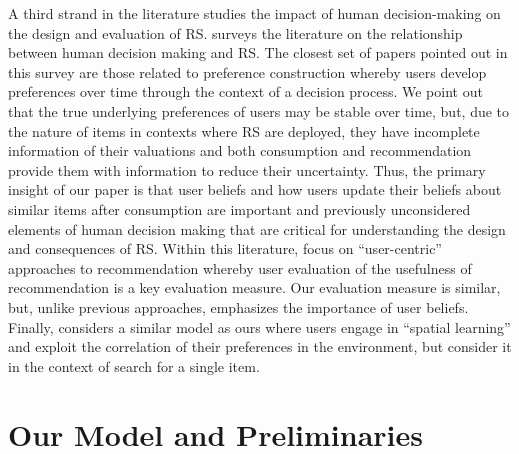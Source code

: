 \documentclass[manuscript]{acmart}
\begin{document}
A third strand in the literature studies the impact of human decision-making on the design and evaluation of RS. \cite{chen2013human} surveys the literature on the relationship between human decision making and RS. The closest set of papers pointed out in this survey are those related to preference construction \cite{bettman1998constructive, lichtenstein2006construction} whereby users develop preferences over time through the context of a decision process. We point out that the true underlying preferences of users may be stable over time, but, due to the nature of items in contexts where RS are deployed, they have incomplete information of their valuations and both consumption and recommendation provide them with information to reduce their uncertainty. Thus, the primary insight of our paper is that user beliefs and how users update their beliefs about similar items after consumption are important and previously unconsidered elements of human decision making that are critical for understanding the design and consequences of RS. Within this literature, \cite{celma2008new, cremonesi2013user, pu2011user} focus on ``user-centric'' approaches to recommendation whereby user evaluation of the usefulness of recommendation is a key evaluation measure. Our evaluation measure is similar, but, unlike previous approaches, emphasizes the importance of user beliefs. Finally, \cite{hodgson2019horse} considers a similar model as ours where users engage in ``spatial learning'' and exploit the correlation of their preferences in the environment, but consider it in the context of search for a single item.

\section{Our Model and Preliminaries}
\end{document}
